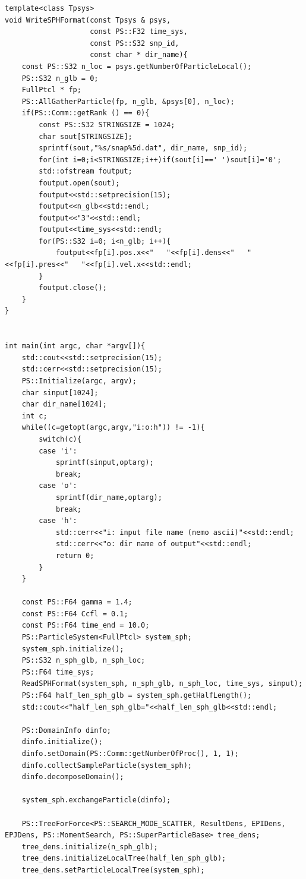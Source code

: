 \begin{lstlisting}[caption=SPHサンプル使用]
template<class Tpsys>
void WriteSPHFormat(const Tpsys & psys,
                    const PS::F32 time_sys,
                    const PS::S32 snp_id,
                    const char * dir_name){
    const PS::S32 n_loc = psys.getNumberOfParticleLocal();
    PS::S32 n_glb = 0;
    FullPtcl * fp;
    PS::AllGatherParticle(fp, n_glb, &psys[0], n_loc);
    if(PS::Comm::getRank () == 0){
        const PS::S32 STRINGSIZE = 1024;
        char sout[STRINGSIZE];
        sprintf(sout,"%s/snap%5d.dat", dir_name, snp_id);
        for(int i=0;i<STRINGSIZE;i++)if(sout[i]==' ')sout[i]='0';
        std::ofstream foutput;
        foutput.open(sout);
        foutput<<std::setprecision(15);
        foutput<<n_glb<<std::endl;
        foutput<<"3"<<std::endl;
        foutput<<time_sys<<std::endl;
        for(PS::S32 i=0; i<n_glb; i++){
            foutput<<fp[i].pos.x<<"   "<<fp[i].dens<<"   "<<fp[i].pres<<"   "<<fp[i].vel.x<<std::endl;
        }
        foutput.close();
    }
}


int main(int argc, char *argv[]){
    std::cout<<std::setprecision(15);
    std::cerr<<std::setprecision(15);
    PS::Initialize(argc, argv);
    char sinput[1024];
    char dir_name[1024];
    int c;
    while((c=getopt(argc,argv,"i:o:h")) != -1){
        switch(c){
        case 'i':
            sprintf(sinput,optarg);
            break;
        case 'o':
            sprintf(dir_name,optarg);
            break;
        case 'h':
            std::cerr<<"i: input file name (nemo ascii)"<<std::endl;
            std::cerr<<"o: dir name of output"<<std::endl;
            return 0;
        }
    }

    const PS::F64 gamma = 1.4;
    const PS::F64 Ccfl = 0.1;
    const PS::F64 time_end = 10.0;
    PS::ParticleSystem<FullPtcl> system_sph;
    system_sph.initialize();
    PS::S32 n_sph_glb, n_sph_loc;
    PS::F64 time_sys;
    ReadSPHFormat(system_sph, n_sph_glb, n_sph_loc, time_sys, sinput);
    PS::F64 half_len_sph_glb = system_sph.getHalfLength();
    std::cout<<"half_len_sph_glb="<<half_len_sph_glb<<std::endl;

    PS::DomainInfo dinfo;
    dinfo.initialize();
    dinfo.setDomain(PS::Comm::getNumberOfProc(), 1, 1);
    dinfo.collectSampleParticle(system_sph);
    dinfo.decomposeDomain();

    system_sph.exchangeParticle(dinfo);

    PS::TreeForForce<PS::SEARCH_MODE_SCATTER, ResultDens, EPIDens, EPJDens, PS::MomentSearch, PS::SuperParticleBase> tree_dens;
    tree_dens.initialize(n_sph_glb);
    tree_dens.initializeLocalTree(half_len_sph_glb);
    tree_dens.setParticleLocalTree(system_sph);


\end{lstlisting}
